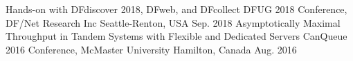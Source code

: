 
\begin{cventries}

\cventry
{Hands-on with DFdiscover 2018, DFweb, and DFcollect} %
{DFUG 2018 Conference, DF/Net Research Inc} %
{Seattle-Renton, USA} %
{Sep. 2018} %
{}
\cventry
{Asymptotically Maximal Throughput in Tandem Systems with Flexible and Dedicated Servers} %
{CanQueue 2016 Conference, McMaster University} %
{Hamilton, Canada} %
{Aug. 2016} %
{}
\end{cventries}
